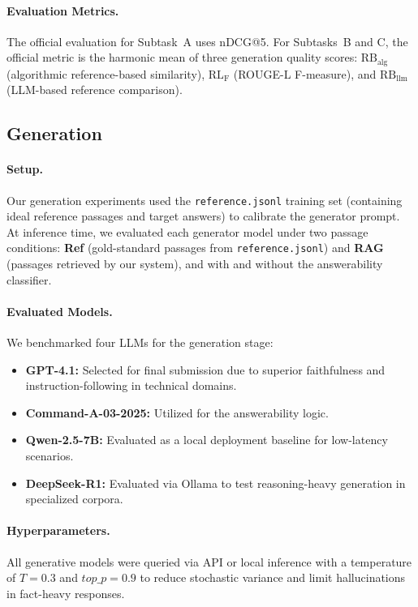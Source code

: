 \documentclass[11pt]{article}
\begin{document}
\paragraph{Evaluation Metrics.}
The official evaluation for Subtask~A uses nDCG@5. For Subtasks~B and C, the official metric is the harmonic mean of three generation quality scores: $\text{RB}_{\text{alg}}$ (algorithmic reference-based similarity), $\text{RL}_{\text{F}}$ (ROUGE-L F-measure), and $\text{RB}_{\text{llm}}$ (LLM-based reference comparison).

\subsection{Generation}

\paragraph{Setup.}
Our generation experiments used the \texttt{reference.jsonl} training set (containing ideal reference passages and target answers) to calibrate the generator prompt. At inference time, we evaluated each generator model under two passage conditions: \textbf{Ref} (gold-standard passages from \texttt{reference.jsonl}) and \textbf{RAG} (passages retrieved by our system), and with and without the answerability classifier.

\paragraph{Evaluated Models.}
We benchmarked four LLMs for the generation stage:
\begin{itemize}[leftmargin=*, itemsep=2pt]
    \item \textbf{GPT-4.1:} Selected for final submission due to superior faithfulness and instruction-following in technical domains.
    \item \textbf{Command-A-03-2025:} Utilized for the answerability logic.
    \item \textbf{Qwen-2.5-7B:} Evaluated as a local deployment baseline for low-latency scenarios.
    \item \textbf{DeepSeek-R1:} Evaluated via Ollama to test reasoning-heavy generation in specialized corpora.
\end{itemize}

\paragraph{Hyperparameters.}
All generative models were queried via API or local inference with a temperature of $T=0.3$ and $top\_p=0.9$ to reduce stochastic variance and limit hallucinations in fact-heavy responses.
\end{document}
